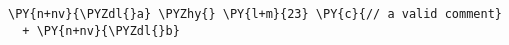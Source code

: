 \begin{Verbatim}[commandchars=\\\{\}]
\PY{n+nv}{\PYZdl{}a} \PYZhy{} \PY{l+m}{23} \PY{c}{// a valid comment}
  + \PY{n+nv}{\PYZdl{}b}
\end{Verbatim}
